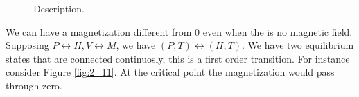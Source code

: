 \documentclass[../main/main.tex]{subfiles}
\begin{document}
\begin{figure}[h!]

\caption{\label{fig:2_10} Description.}
\end{figure}

We can have a magnetization different from 0 even when the is no magnetic field.
Supposing \( P \leftrightarrow H, V \leftrightarrow M \), we have \( (P,T) \leftrightarrow (H,T) \). We have two equilibrium states that are connected continuosly, this is a first order transition. For instance consider Figure \ref{fig:2_11}. At  the critical point the magnetization would pass through zero.
\end{document}
